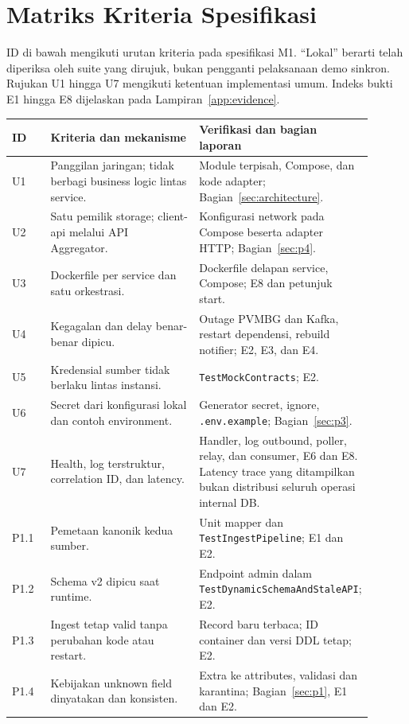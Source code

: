 \section{Matriks Kriteria Spesifikasi}
\label{app:matrix}
ID di bawah mengikuti urutan kriteria pada spesifikasi M1. ``Lokal'' berarti telah diperiksa oleh suite yang dirujuk, bukan pengganti pelaksanaan demo sinkron. Rujukan U1 hingga U7 mengikuti ketentuan implementasi umum. Indeks bukti E1 hingga E8 dijelaskan pada Lampiran~\ref{app:evidence}.

\small
\begin{longtable}{P{0.11\linewidth}P{0.45\linewidth}P{0.34\linewidth}}
\toprule ID & Kriteria dan mekanisme & Verifikasi dan bagian laporan\\\midrule\endhead
U1 & Panggilan jaringan; tidak berbagi business logic lintas service. & Module terpisah, Compose, dan kode adapter; Bagian~\ref{sec:architecture}.\\
U2 & Satu pemilik storage; client-api melalui API Aggregator. & Konfigurasi network pada Compose beserta adapter HTTP; Bagian~\ref{sec:p4}.\\
U3 & Dockerfile per service dan satu orkestrasi. & Dockerfile delapan service, Compose; E8 dan petunjuk start.\\
U4 & Kegagalan dan delay benar-benar dipicu. & Outage PVMBG dan Kafka, restart dependensi, rebuild notifier; E2, E3, dan E4.\\
U5 & Kredensial sumber tidak berlaku lintas instansi. & \texttt{TestMockContracts}; E2.\\
U6 & Secret dari konfigurasi lokal dan contoh environment. & Generator secret, ignore, \texttt{.env.example}; Bagian~\ref{sec:p3}.\\
U7 & Health, log terstruktur, correlation ID, dan latency. & Handler, log outbound, poller, relay, dan consumer, E6 dan E8. Latency trace yang ditampilkan bukan distribusi seluruh operasi internal DB.\\
\midrule
P1.1 & Pemetaan kanonik kedua sumber. & Unit mapper dan \texttt{TestIngestPipeline}; E1 dan E2.\\
P1.2 & Schema v2 dipicu saat runtime. & Endpoint admin dalam \texttt{TestDynamicSchemaAndStaleAPI}; E2.\\
P1.3 & Ingest tetap valid tanpa perubahan kode atau restart. & Record baru terbaca; ID container dan versi DDL tetap; E2.\\
P1.4 & Kebijakan unknown field dinyatakan dan konsisten. & Extra ke attributes, validasi dan karantina; Bagian~\ref{sec:p1}, E1 dan E2.\\

\end{longtable}
